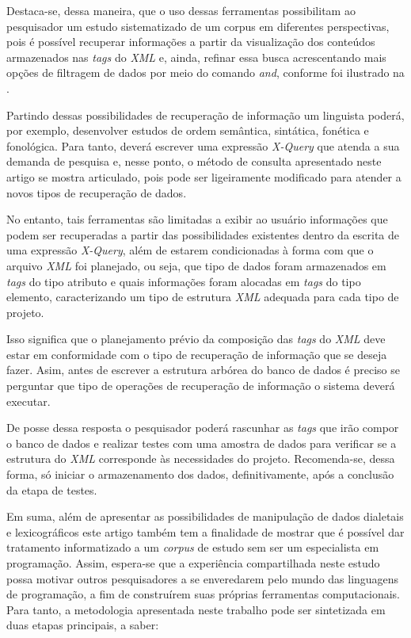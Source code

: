 \documentclass[portuguese]{textolivre}
\begin{document}
Destaca-se, dessa maneira, que o uso dessas ferramentas possibilitam ao pesquisador um estudo sistematizado de um corpus em diferentes perspectivas, pois é possível recuperar informações a partir da visualização dos conteúdos armazenados nas \emph{tags} do \emph{XML} e, ainda, refinar essa busca acrescentando mais opções de filtragem de dados por meio do comando \emph{and}, conforme foi ilustrado na .

Partindo dessas possibilidades de recuperação de informação um linguista poderá, por exemplo, desenvolver estudos de ordem semântica, sintática, fonética e fonológica. Para tanto, deverá escrever uma expressão \emph{X-Query} que atenda a sua demanda de pesquisa e, nesse ponto, o método de consulta apresentado neste artigo se mostra articulado, pois pode ser ligeiramente modificado para atender a novos tipos de recuperação de dados.

No entanto, tais ferramentas são limitadas a exibir ao usuário informações que podem ser recuperadas a partir das possibilidades existentes dentro da escrita de uma expressão \emph{X-Query}, além de estarem condicionadas à forma com que o arquivo \emph{XML} foi planejado, ou seja, que tipo de dados foram armazenados em \emph{tags} do tipo atributo e quais informações foram alocadas em \emph{tags} do tipo elemento, caracterizando um tipo de estrutura \emph{XML} adequada para cada tipo de projeto.

Isso significa que o planejamento prévio da composição das \emph{tags} do \emph{XML} deve estar em conformidade com o tipo de recuperação de informação que se deseja fazer. Asim, antes de escrever a estrutura arbórea do banco de dados é preciso se perguntar  que tipo de operações de recuperação de informação o sistema deverá executar. 

De posse dessa resposta o pesquisador poderá rascunhar as \emph{tags} que irão compor o banco de dados e realizar testes com uma amostra de dados para verificar se a estrutura do \emph{XML} corresponde às necessidades do projeto. Recomenda-se, dessa forma, só iniciar o armazenamento dos dados, definitivamente, após a conclusão da etapa de testes.

Em suma, além de apresentar as possibilidades de manipulação de dados  dialetais e lexicográficos este artigo também tem a finalidade de mostrar que é possível dar tratamento informatizado a um \emph{corpus} de estudo sem ser um especialista em programação. Assim, espera-se que a experiência compartilhada neste estudo possa motivar outros pesquisadores a se enveredarem pelo mundo das linguagens de programação, a fim de construírem suas próprias ferramentas computacionais. Para tanto, a metodologia apresentada neste trabalho pode ser sintetizada em duas etapas principais, a saber:
\end{document}
